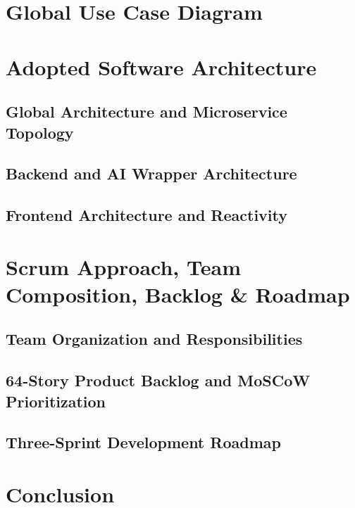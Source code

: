 \section{Global Use Case Diagram}
\label{sec:ch3_global_use_case}

\section{Adopted Software Architecture}
\label{sec:ch3_software_architecture}
\subsection{Global Architecture and Microservice Topology}
\label{subsec:ch3_global_arch}

\subsection{Backend and AI Wrapper Architecture}
\label{subsec:ch3_backend_ai_arch}

\subsection{Frontend Architecture and Reactivity}
\label{subsec:ch3_frontend_arch}

\section{Scrum Approach, Team Composition, Backlog \& Roadmap}
\label{sec:ch3_scrum_roadmap}
\subsection{Team Organization and Responsibilities}
\label{subsec:ch3_team_org}

\subsection{64-Story Product Backlog and MoSCoW Prioritization}
\label{subsec:ch3_backlog_table}

\subsection{Three-Sprint Development Roadmap}
\label{subsec:ch3_sprint_roadmap}

\section{Conclusion}
\label{sec:ch3_conclusion}
